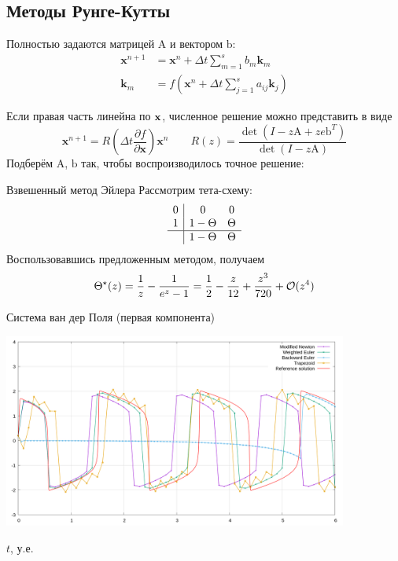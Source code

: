 \documentclass[
    14pt,
    xcolor=dvipsnames,
    aspectratio=169
]{beamer}
\begin{document}
\subsection{Методы Рунге-Кутты}

\begin{frame}{\subsecname}
    Полностью задаются матрицей $ \mathrm{A} $ и вектором $ \mathrm{b} $:
    \begin{align*}
        \mathbf{x}^{n+1} &= \mathbf{x}^n + \Delta t \sum_{m=1}^s b_m \mathbf{k}_m \\
        \mathbf{k}_m &= f \left( \mathbf{x}^n + \Delta t \sum_{j = 1}^s a_{ij} \mathbf{k}_j \right)
    \end{align*}
\end{frame}

\begin{frame}{\subsecname}
    Если правая часть линейна по $ \mathbf{x} $, численное решение можно представить в виде
    \[
        \mathbf{x}^{n+1} = R \left( \Delta t \frac{\partial f}{\partial \mathbf{x}} \right) \mathbf{x}^n
        \qquad
        R(z) = \frac{\det \left(I - z \mathrm{A} + z e \mathrm{b}^T \right)}{\det \left(I - z \mathrm{A} \right)}
    \]
    Подберём $ \mathrm{A} $, $ \mathrm{b} $ так, чтобы воспроизводилось точное решение:
\end{frame}

\begin{frame}{Взвешенный метод Эйлера}
    Рассмотрим тета-схему:
    \[
        \begin{array}{c|cc}
            0 & 0 & 0 \\
            1 & 1 - \Theta & \Theta \\
            \hline
             & 1 - \Theta & \Theta
        \end{array}
    \]
    Воспользовавшись предложенным методом, получаем
    \[
        \Theta^\star(z) = \frac{1}{z} - \frac{1}{e^z - 1} = \frac{1}{2} - \frac{z}{12} + \frac{z^3}{720} + \mathcal{O}(z^4)
    \]
\end{frame}

\begin{frame}{Система ван дер Поля (первая компонента)}
    \begin{center}
        \includegraphics[width=0.85\textwidth]{./images/slides/van_der_Pol.png}

        \vspace{-1.0\baselineskip}
        {\tiny $ t $, у.е.}
    \end{center}
\end{frame}
\end{document}
